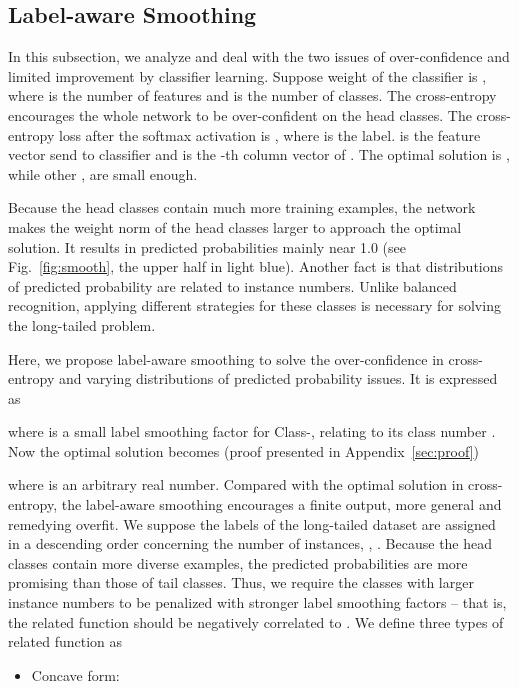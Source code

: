 \documentclass[final]{cvpr}
\begin{document}
	
\subsection{Label-aware Smoothing}\label{sec:las}
	
	
	In this subsection, we analyze and deal with the two issues of over-confidence and limited improvement by classifier learning. Suppose weight of the classifier is , where  is the number of features and  is the number of classes. The cross-entropy encourages the whole network to be over-confident on the head classes. The cross-entropy loss after the softmax activation is , where  is the label.  is the feature vector send to classifier and  is the -th column vector of . The optimal solution is , while other ,  are small enough. 
	
	Because the head classes contain much more training examples, the network makes the weight norm  of the head classes larger to approach the optimal solution. It results in predicted probabilities mainly near 1.0 (see Fig.~\ref{fig:smooth}, the upper half in light blue). Another fact is that distributions of predicted probability are related to instance numbers. Unlike balanced recognition, applying different strategies for these classes is necessary for solving the long-tailed problem.
	
	


	Here, we propose label-aware smoothing to solve the over-confidence in cross-entropy and varying distributions of predicted probability issues. It is expressed as
	
	where  is a small label smoothing factor for Class-, relating to its class number . Now the optimal solution becomes (proof presented in Appendix~\ref{sec:proof})
	
	where  is an arbitrary real number. Compared with the optimal solution in cross-entropy, the label-aware smoothing encourages a finite output, more general and remedying overfit. We suppose the labels of the long-tailed dataset are assigned in a descending order concerning the number of instances, \ie, . Because the head classes contain more diverse examples, the predicted probabilities are more promising than those of tail classes. Thus, we require the classes with larger instance numbers to be penalized with stronger label smoothing factors -- that is, the related function  should be negatively correlated to . We define three types of related function  as
	\begin{itemize}
		\item Concave form:
	\end{itemize}
	
\end{document}
